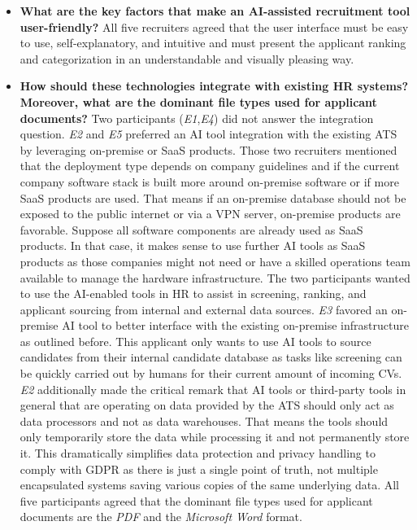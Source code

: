 \documentclass[draft,final]{thesisclass} %
\begin{document}
\begin{enumerate}
    \begin{itemize}
        \item \textbf{What are the key factors that make an \acs{AI}-assisted recruitment tool user-friendly?}
        All five recruiters agreed that the user interface must be easy to use, self-explanatory, and intuitive and must present the applicant ranking and categorization in an understandable and visually pleasing way.
        \item \textbf{How should these technologies integrate with existing \acs{HR} systems? Moreover, what are the dominant file types used for applicant documents?}
        Two participants (\textit{E1},\textit{E4}) did not answer the integration question. \textit{E2} and \textit{E5} preferred an \acs{AI} tool integration with the existing \acs{ATS} by leveraging on-premise or \acs{SaaS} products. Those two recruiters mentioned that the deployment type depends on company guidelines and if the current company software stack is built more around on-premise software or if more \acs{SaaS} products are used. That means if an on-premise database should not be exposed to the public internet or via a VPN server, on-premise products are favorable. Suppose all software components are already used as \acs{SaaS} products. In that case, it makes sense to use further \acs{AI} tools as \acs{SaaS} products as those companies might not need or have a skilled operations team available to manage the hardware infrastructure. The two participants wanted to use the \acs{AI}-enabled tools in \acs{HR} to assist in screening, ranking, and applicant sourcing from internal and external data sources.
        \textit{E3} favored an on-premise \acs{AI} tool to better interface with the existing on-premise infrastructure as outlined before. This applicant only wants to use \acs{AI} tools to source candidates from their internal candidate database as tasks like screening can be quickly carried out by humans for their current amount of incoming \acs{CV}s.
        \textit{E2} additionally made the critical remark that \acs{AI} tools or third-party tools in general that are operating on data provided by the \acs{ATS} should only act as data processors and not as data warehouses. That means the tools should only temporarily store the data while processing it and not permanently store it.
        This dramatically simplifies data protection and privacy handling to comply with \acs{GDPR} as there is just a single point of truth, not multiple encapsulated systems saving various copies of the same underlying data.
        All five participants agreed that the dominant file types used for applicant documents are the \textit{PDF} and the \textit{Microsoft Word} format.

\end{itemize}
\end{enumerate}
\end{document}
